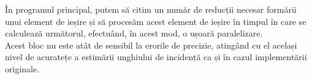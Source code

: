 În programul principal, putem să citim un număr de reducții necesar formării
unui element de ieșire și să procesăm acest element de ieșire în timpul în
care se calculează următorul, efectuând, în acest mod, o ușoară paralelizare. \\

Acest bloc nu este atât de sensibil la erorile de precizie, atingând cu el
același nivel de acuratețe a estimării unghiului de incidență ca și în cazul
implementării originale.
